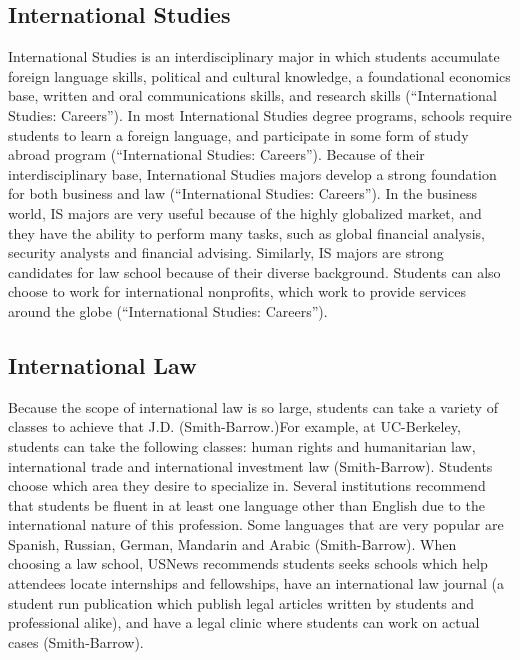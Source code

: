     \subsection{International Studies}
        International Studies is an interdisciplinary major in which students accumulate foreign language skills, political and cultural knowledge, a foundational economics base, written and oral communications skills, and research skills (“International Studies: Careers”). In most International Studies degree programs, schools require students to learn a foreign language, and participate in some form of study abroad program (“International Studies: Careers”). Because of their interdisciplinary base, International Studies majors develop a strong foundation for both business and law (“International Studies: Careers”). In the business world, IS majors are very useful because of the highly globalized market, and they have the ability to perform many tasks, such as global financial analysis, security analysts and financial advising. Similarly, IS majors are strong candidates for law school because of their diverse background. Students can also choose to work for international nonprofits, which work to provide services around the globe (“International Studies: Careers”). 
    \subsection{International Law}
        Because the scope of international law is so large, students can take a variety of classes to achieve that J.D. (Smith-Barrow.)For example, at UC-Berkeley, students can take the following classes: human rights and humanitarian law, international trade and international investment law (Smith-Barrow). Students choose which area they desire to specialize in. Several institutions recommend that students be fluent in at least one language other than English due to the international nature of this profession. Some languages that are very popular are Spanish, Russian, German, Mandarin and Arabic (Smith-Barrow). When choosing a law school, USNews recommends students seeks schools which help attendees locate internships and fellowships, have an international law journal (a student run publication which publish legal articles written by students and professional alike), and have a legal clinic where students can work on actual cases (Smith-Barrow). 

